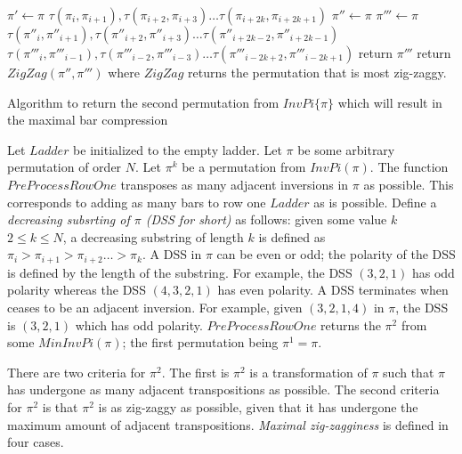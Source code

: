     \begin{algorithm}
         \begin{algorithmic}[1]
                \State \small{$\pi' \gets \pi$}
                    \State $\tau(\pi_{i},\pi_{i+1}),\tau(\pi_{i+2},\pi_{i+3}) \dots \tau(\pi_{i+2k},\pi_{i+2k+1})$
                \EndFor
                \State 
                \State \small{$\pi'' \gets \pi$}
                \State \small{$\pi''' \gets \pi$}
                    \State $\tau(\pi''_{i},\pi''_{i+1}),\tau(\pi''_{i+2},\pi''_{i+3}) \dots \tau(\pi''_{i+2k-2},\pi''_{i+2k-1})$
                \EndFor
                    \State $\tau(\pi'''_{i},\pi'''_{i-1}),\tau(\pi'''_{i-2},\pi'''_{i-3}) \dots \tau(\pi'''_{i-2k+2},\pi'''_{i-2k+1})$
                \EndFor
                    \State return $\pi'''$
                \Else 
                    \State \small{return $ZigZag(\pi'',\pi''')$ where $ZigZag$ returns the permutation that is most zig-zaggy.}
                \EndIf

            \EndFunction
        
        \end{algorithmic} 
        \caption{Algorithm to return the second permutation from $InvPi\{\pi\}$ which will result in the maximal bar compression}
        \label{Algo:PreProcessRow}
\end{algorithm}




Let $Ladder$ be initialized to the empty ladder. Let $\pi$ be some arbitrary permutation of order $N$. Let $\pi^{k}$ be a permutation 
from $InvPi(\pi)$. The function $PreProcessRowOne$ 
transposes as many adjacent inversions in $\pi$ as possible. This corresponds to adding as many bars to row one $Ladder$ as is possible. 
Define a \emph{decreasing subsrting of $\pi$ (DSS for short)}
as follows: given some value $k$ $2 \leq k \leq N$, a decreasing substring of length $k$ is defined as $\pi_{i}>\pi_{i+1}>\pi_{i+2} \dots > \pi_{k}$.
A DSS in $\pi$ can 
be even or odd; the polarity of the DSS is defined by the length of the substring. For example, 
the DSS $(3,2,1)$ has odd polarity whereas the DSS $(4,3,2,1)$ has even polarity. A DSS terminates when ceases to be an adjacent inversion. 
For example, given $(3,2,1,4)$ in $\pi$, the DSS is $(3,2,1)$ which 
has odd polarity. $PreProcessRowOne$ returns the $\pi^{2}$ from some $MinInvPi(\pi)$; the first permutation being $\pi^{1}=\pi$.\par 
There are two criteria for $\pi^{2}$. The first is $\pi^{2}$ is a transformation of $\pi$ such that $\pi$ has undergone as many adjacent transpositions as possible.
The second criteria for $\pi^{2}$ is that $\pi^{2}$ is as zig-zaggy as possible, given that it has undergone the maximum amount of 
adjacent transpositions. \emph{Maximal zig-zagginess} is defined in four cases. 

